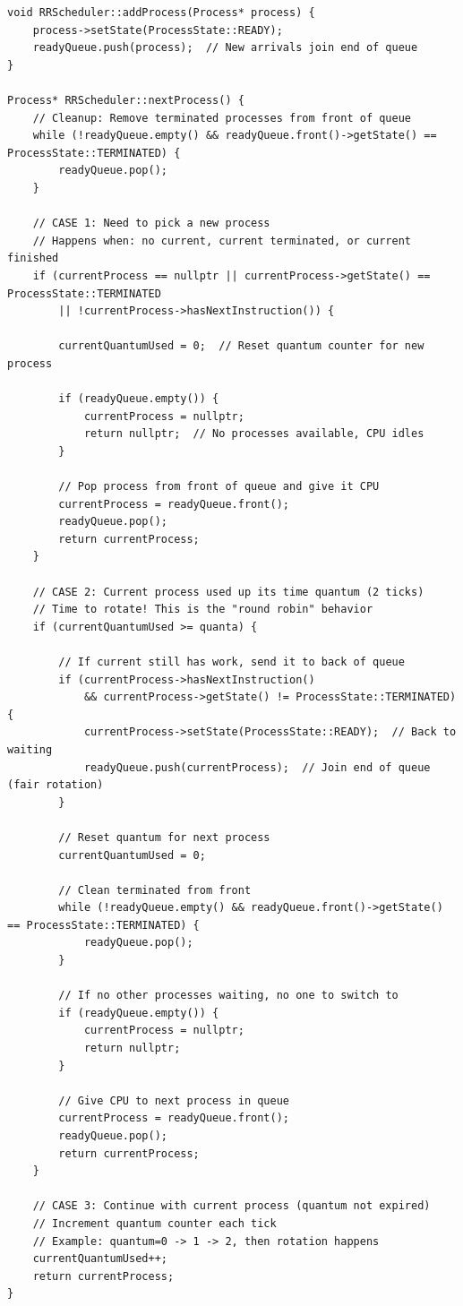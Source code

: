\documentclass[a4paper,10pt,oneside]{article}
\begin{document}
\begin{multicols*}{\COLS}
\begin{lstlisting}
void RRScheduler::addProcess(Process* process) {
    process->setState(ProcessState::READY);
    readyQueue.push(process);  // New arrivals join end of queue
}

Process* RRScheduler::nextProcess() {
    // Cleanup: Remove terminated processes from front of queue
    while (!readyQueue.empty() && readyQueue.front()->getState() == ProcessState::TERMINATED) {
        readyQueue.pop();
    }

    // CASE 1: Need to pick a new process
    // Happens when: no current, current terminated, or current finished
    if (currentProcess == nullptr || currentProcess->getState() == ProcessState::TERMINATED 
        || !currentProcess->hasNextInstruction()) {
        
        currentQuantumUsed = 0;  // Reset quantum counter for new process
        
        if (readyQueue.empty()) {
            currentProcess = nullptr;
            return nullptr;  // No processes available, CPU idles
        }
        
        // Pop process from front of queue and give it CPU
        currentProcess = readyQueue.front();
        readyQueue.pop();
        return currentProcess;
    }

    // CASE 2: Current process used up its time quantum (2 ticks)
    // Time to rotate! This is the "round robin" behavior
    if (currentQuantumUsed >= quanta) {
        
        // If current still has work, send it to back of queue
        if (currentProcess->hasNextInstruction() 
            && currentProcess->getState() != ProcessState::TERMINATED) {
            currentProcess->setState(ProcessState::READY);  // Back to waiting
            readyQueue.push(currentProcess);  // Join end of queue (fair rotation)
        }
        
        // Reset quantum for next process
        currentQuantumUsed = 0;
        
        // Clean terminated from front
        while (!readyQueue.empty() && readyQueue.front()->getState() == ProcessState::TERMINATED) {
            readyQueue.pop();
        }
        
        // If no other processes waiting, no one to switch to
        if (readyQueue.empty()) {
            currentProcess = nullptr;
            return nullptr;
        }
        
        // Give CPU to next process in queue
        currentProcess = readyQueue.front();
        readyQueue.pop();
        return currentProcess;
    }

    // CASE 3: Continue with current process (quantum not expired)
    // Increment quantum counter each tick
    // Example: quantum=0 -> 1 -> 2, then rotation happens
    currentQuantumUsed++;
    return currentProcess;
}
\end{lstlisting}

\end{multicols*}
\end{document}
